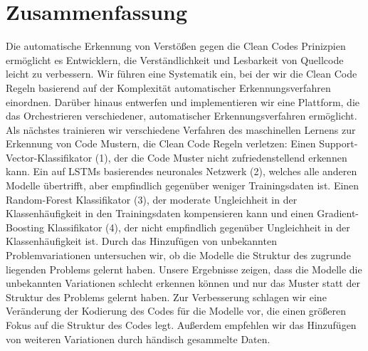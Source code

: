 \section*{Zusammenfassung}

Die automatische Erkennung von Verstößen gegen die Clean Codes Prinizpien ermöglicht es Entwicklern, die Verständlichkeit und Lesbarkeit von Quellcode leicht zu verbessern. Wir führen eine Systematik ein, bei der wir die Clean Code Regeln basierend auf der Komplexität automatischer Erkennungsverfahren einordnen. Darüber hinaus entwerfen und implementieren wir eine Plattform, die das Orchestrieren verschiedener, automatischer Erkennungsverfahren ermöglicht. Als nächstes trainieren wir verschiedene Verfahren des maschinellen Lernens zur Erkennung von Code Mustern, die Clean Code Regeln verletzen: Einen Support-Vector-Klassifikator (1), der die Code Muster nicht zufriedenstellend erkennen kann. Ein auf LSTMs basierendes neuronales Netzwerk (2), welches alle anderen Modelle übertrifft, aber empfindlich gegenüber weniger Trainingsdaten ist. Einen Random-Forest Klassifikator (3), der moderate Ungleichheit in der Klassenhäufigkeit in den Trainingsdaten kompensieren kann und einen Gradient-Boosting Klassifikator (4), der nicht empfindlich gegenüber Ungleichheit in der Klassenhäufigkeit ist. Durch das Hinzufügen von unbekannten Problemvariationen untersuchen wir, ob die Modelle die Struktur des zugrunde liegenden Problems gelernt haben. Unsere Ergebnisse zeigen, dass die Modelle die unbekannten Variationen schlecht erkennen können und nur das Muster statt der Struktur des Problems gelernt haben. Zur Verbesserung schlagen wir eine Veränderung der Kodierung des Codes für die Modelle vor, die einen größeren Fokus auf die Struktur des Codes legt. Außerdem empfehlen wir das Hinzufügen von weiteren Variationen durch händisch gesammelte Daten.
 
\newpage
